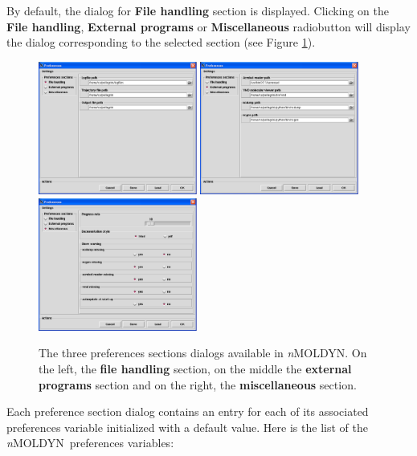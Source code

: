 \documentclass[a4paper,11pt]{report}
\newcommand{\NMOLDYN}{\textit{n}MOLDYN}
\begin{document}
By default, the dialog for \textbf{File handling} section is displayed. Clicking on the \textbf{File handling}, 
\textbf{External programs} or \textbf{Miscellaneous} radiobutton will display the dialog corresponding to the selected 
section (see Figure \ref{fig:preferences_sections}).
\begin{figure}[h!]
\begin{center}
\includegraphics[width=5.2cm]{Figures/preferences_file_handling.eps}
\includegraphics[width=5.2cm]{Figures/preferences_external_programs.eps}
\includegraphics[width=5.2cm]{Figures/preferences_miscellaneous.eps}
\end{center}
\caption[The three preferences sections]{The three preferences sections dialogs available in \NMOLDYN . On the left, 
the \textbf{file handling} section, on the middle the \textbf{external programs} section and on the right, the \textbf{miscellaneous} section.}
\label{fig:preferences_sections}
\end{figure}   
\newpage
Each preference section dialog contains an entry for each of its associated preferences variable initialized with a 
default value. Here is the list of the \NMOLDYN\ preferences variables:
\end{document}
